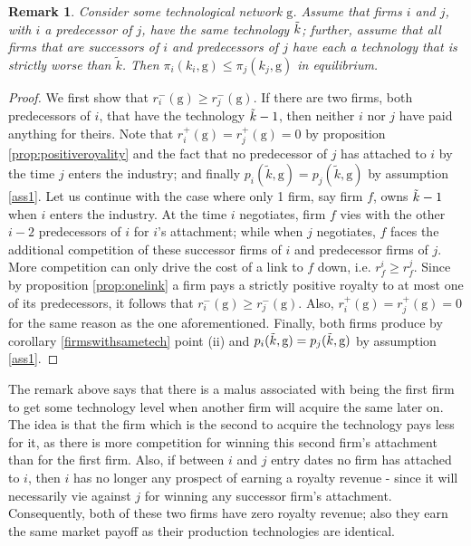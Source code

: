 \documentclass{article}
\newtheorem{remark}{Remark}
\begin{document}
\begin{remark}
Consider some technological network $\text{g}$. Assume that firms $i$ and $j$, with $i$ a predecessor of $j$, have the same technology $\Tilde{k}$; further, assume that all firms that are successors of $i$ and predecessors of $j$ have each a technology that is strictly worse than $\tilde{k}$. Then $\pi_i(k_i,\text{g})\leq \pi_j(k_j,\text{g})$ in equilibrium.  
\end{remark}
\begin{proof}
We first show that $r^{-}_i(\text{g})\geq r^{-}_j(\text{g})$. If there are two firms, both predecessors of $i$, that have the technology $\Tilde{k}-1$, then neither $i$ nor $j$ have paid anything for theirs. Note that $r^+_i(\text{g})=r^+_j(\text{g})=0$ by proposition \ref{prop:positiveroyality} and the fact that no predecessor of $j$ has attached to $i$ by the time $j$ enters the industry; and finally $p_i(\tilde{k},\text{g})=p_j(\tilde{k},\text{g})$ by assumption \ref{ass1}. Let us continue with the case where only 1 firm, say firm $f$, owns $\Tilde{k}-1$ when $i$ enters the industry. At the time $i$ negotiates, firm $f$ vies with the other $i-2$ predecessors of $i$ for $i$'s attachment; while when $j$ negotiates, $f$ faces the additional competition of these successor firms of $i$ and predecessor firms of $j$. More competition can only drive the cost of a link to $f$ down, i.e. $r^{i}_{f}\geq r^{j}_{f}$. Since by proposition \ref{prop:onelink} a firm pays a strictly positive royalty to at most one of its predecessors, it follows that $r^{-}_i(\text{g})\geq r^{-}_j(\text{g})$.
Also, $r^{+}_i(\text{g})=r^{+}_j(\text{g})=0$ for the same reason as the one aforementioned. Finally, both firms produce by corollary \ref{firmswithsametech} point (ii) and  $p_i(\Tilde{k},\text{g})=p_j(\Tilde{k},\text{g})$ by assumption \ref{ass1}. 
\end{proof}

The remark above says that there is a malus associated with being the first firm to get some technology level when another firm will acquire the same later on. The idea is that the firm which is the second to acquire the technology pays less for it, as there is more competition for winning this second firm's attachment than for the first firm. Also, if between $i$ and $j$ entry dates no firm has attached to $i$, then $i$ has no longer any prospect of earning a royalty revenue - since it will necessarily vie against $j$ for winning any successor firm's attachment. Consequently, both of these two firms have zero royalty revenue; also they earn the same market payoff as their production technologies are identical. \\
\end{document}
